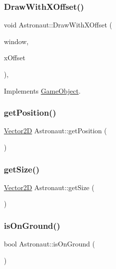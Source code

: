 \subsubsection{\texorpdfstring{Draw\+With\+X\+Offset()}{DrawWithXOffset()}}
{\footnotesize\ttfamily void Astronaut\+::\+Draw\+With\+X\+Offset (\begin{DoxyParamCaption}\item[{sf\+::\+Render\+Window \&}]{window,  }\item[{float}]{x\+Offset }\end{DoxyParamCaption})\hspace{0.3cm}{\ttfamily [override]}, {\ttfamily [virtual]}}



Implements \hyperlink{class_game_object_a8a3c07e92775fe00baa9e661fefb224e}{Game\+Object}.

\hypertarget{class_astronaut_a1d2ea689431e8aa1d783380b19115f7e}{}\label{class_astronaut_a1d2ea689431e8aa1d783380b19115f7e} 
\subsubsection{\texorpdfstring{get\+Position()}{getPosition()}}
{\footnotesize\ttfamily \hyperlink{class_vector2_d}{Vector2D} Astronaut\+::get\+Position (\begin{DoxyParamCaption}{ }\end{DoxyParamCaption})}

\hypertarget{class_astronaut_a6a526a639f9030f9638c845d90fbf3e4}{}\label{class_astronaut_a6a526a639f9030f9638c845d90fbf3e4} 
\subsubsection{\texorpdfstring{get\+Size()}{getSize()}}
{\footnotesize\ttfamily \hyperlink{class_vector2_d}{Vector2D} Astronaut\+::get\+Size (\begin{DoxyParamCaption}{ }\end{DoxyParamCaption})}

\hypertarget{class_astronaut_a1d7672f8b2d02bcb5bd25bd56b92c3b7}{}\label{class_astronaut_a1d7672f8b2d02bcb5bd25bd56b92c3b7} 
\subsubsection{\texorpdfstring{is\+On\+Ground()}{isOnGround()}}
{\footnotesize\ttfamily bool Astronaut\+::is\+On\+Ground (\begin{DoxyParamCaption}{ }\end{DoxyParamCaption})}

